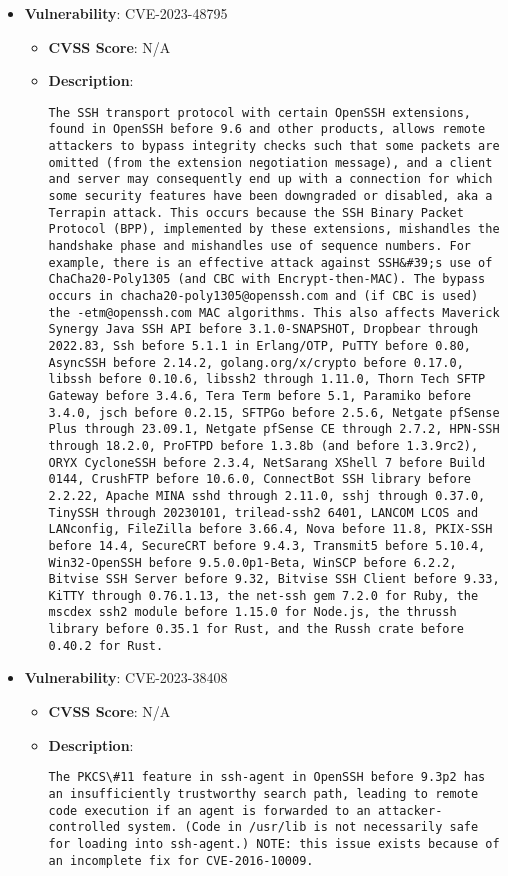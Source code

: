 \documentclass{article}
\begin{document}
\begin{itemize}
        \item \textbf{Vulnerability}: CVE-2023-48795
        \begin{itemize}
            \item \textbf{CVSS Score}:  N/A 
            \item \textbf{Description}:
            \parbox[t]{0.9\linewidth}{
                \verb|The SSH transport protocol with certain OpenSSH extensions, found in OpenSSH before 9.6 and other products, allows remote attackers to bypass integrity checks such that some packets are omitted (from the extension negotiation message), and a client and server may consequently end up with a connection for which some security features have been downgraded or disabled, aka a Terrapin attack. This occurs because the SSH Binary Packet Protocol (BPP), implemented by these extensions, mishandles the handshake phase and mishandles use of sequence numbers. For example, there is an effective attack against SSH&#39;s use of ChaCha20-Poly1305 (and CBC with Encrypt-then-MAC). The bypass occurs in chacha20-poly1305@openssh.com and (if CBC is used) the -etm@openssh.com MAC algorithms. This also affects Maverick Synergy Java SSH API before 3.1.0-SNAPSHOT, Dropbear through 2022.83, Ssh before 5.1.1 in Erlang/OTP, PuTTY before 0.80, AsyncSSH before 2.14.2, golang.org/x/crypto before 0.17.0, libssh before 0.10.6, libssh2 through 1.11.0, Thorn Tech SFTP Gateway before 3.4.6, Tera Term before 5.1, Paramiko before 3.4.0, jsch before 0.2.15, SFTPGo before 2.5.6, Netgate pfSense Plus through 23.09.1, Netgate pfSense CE through 2.7.2, HPN-SSH through 18.2.0, ProFTPD before 1.3.8b (and before 1.3.9rc2), ORYX CycloneSSH before 2.3.4, NetSarang XShell 7 before Build 0144, CrushFTP before 10.6.0, ConnectBot SSH library before 2.2.22, Apache MINA sshd through 2.11.0, sshj through 0.37.0, TinySSH through 20230101, trilead-ssh2 6401, LANCOM LCOS and LANconfig, FileZilla before 3.66.4, Nova before 11.8, PKIX-SSH before 14.4, SecureCRT before 9.4.3, Transmit5 before 5.10.4, Win32-OpenSSH before 9.5.0.0p1-Beta, WinSCP before 6.2.2, Bitvise SSH Server before 9.32, Bitvise SSH Client before 9.33, KiTTY through 0.76.1.13, the net-ssh gem 7.2.0 for Ruby, the mscdex ssh2 module before 1.15.0 for Node.js, the thrussh library before 0.35.1 for Rust, and the Russh crate before 0.40.2 for Rust.|
            }
        \end{itemize}
    
        \item \textbf{Vulnerability}: CVE-2023-38408
        \begin{itemize}
            \item \textbf{CVSS Score}:  N/A 
            \item \textbf{Description}:
            \parbox[t]{0.9\linewidth}{
                \verb|The PKCS\#11 feature in ssh-agent in OpenSSH before 9.3p2 has an insufficiently trustworthy search path, leading to remote code execution if an agent is forwarded to an attacker-controlled system. (Code in /usr/lib is not necessarily safe for loading into ssh-agent.) NOTE: this issue exists because of an incomplete fix for CVE-2016-10009.|
            }
        \end{itemize}
    

\end{itemize}
\end{document}
